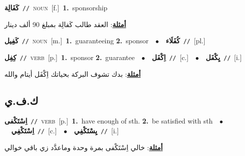 \documentclass[10pt,a4paper,twoside]{article} %
\begin{document}
\begin{multicols}{2}
{\setlength\topsep{0pt}\textbf{\foreignlanguage{arabic}{كَفَالِة}}\ {\color{gray}\texttt{//}\color{black}}\ \textsc{noun}\ [f.]\ \textbf{1.}~sponsorship\  \begin{flushright}\color{gray}\foreignlanguage{arabic}{\textbf{\underline{\foreignlanguage{arabic}{أمثلة}}}: العقد طالب كَفالِة بمبلغ 90 ألف دينار}\end{flushright}\color{black}} \vspace{2mm}

{\setlength\topsep{0pt}\textbf{\foreignlanguage{arabic}{كَفِيل}}\ {\color{gray}\texttt{//}\color{black}}\ \textsc{noun}\ [m.]\ \textbf{1.}~guaranteeing  \textbf{2.}~sponsor\ \ $\bullet$\ \ \setlength\topsep{0pt}\textbf{\foreignlanguage{arabic}{كُفَلَاء}}\ {\color{gray}\texttt{//}\color{black}}\ [pl.]\ } \vspace{2mm}

{\setlength\topsep{0pt}\textbf{\foreignlanguage{arabic}{كِفِل}}\ {\color{gray}\texttt{//}\color{black}}\ \textsc{verb}\ [p.]\ \textbf{1.}~sponsor  \textbf{2.}~guarantee\ \ $\bullet$\ \ \setlength\topsep{0pt}\textbf{\foreignlanguage{arabic}{اِكْفَل}}\ {\color{gray}\texttt{//}\color{black}}\ [c.]\ \ $\bullet$\ \ \setlength\topsep{0pt}\textbf{\foreignlanguage{arabic}{يِكْفَل}}\ {\color{gray}\texttt{//}\color{black}}\ [i.]\  \begin{flushright}\color{gray}\foreignlanguage{arabic}{\textbf{\underline{\foreignlanguage{arabic}{أمثلة}}}: بدك تشوف البركة بحياتك اِكْفَل أيتام والله}\end{flushright}\color{black}} \vspace{2mm}

\vspace{-3mm}
\subsection*{\color{blue}\foreignlanguage{arabic}{ك.ف.ي}\color{blue}{}} 

{\setlength\topsep{0pt}\textbf{\foreignlanguage{arabic}{اِسْتَكْفى}}\ {\color{gray}\texttt{//}\color{black}}\ \textsc{verb}\ [p.]\ \textbf{1.}~have enough of sth.  \textbf{2.}~be satisfied with sth\ \ $\bullet$\ \ \setlength\topsep{0pt}\textbf{\foreignlanguage{arabic}{اِسْتَكْفِي}}\ {\color{gray}\texttt{//}\color{black}}\ [c.]\ \ $\bullet$\ \ \setlength\topsep{0pt}\textbf{\foreignlanguage{arabic}{يِسْتَكْفِي}}\ {\color{gray}\texttt{//}\color{black}}\ [i.]\  \begin{flushright}\color{gray}\foreignlanguage{arabic}{\textbf{\underline{\foreignlanguage{arabic}{أمثلة}}}: خالي اِسْتَكْفى بمرة وحدة وماعدَّد زي باقي خوالي}\end{flushright}\color{black}} \vspace{2mm}


\end{multicols}
\end{document}
